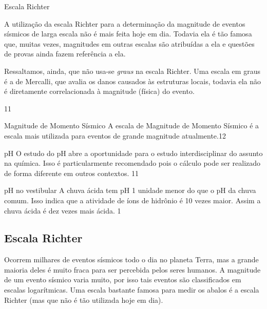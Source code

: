 \cleardoublepage
\def\currentcolor{session1}
\begin{sugestions}{Escala Richter}
{A utilização da escala Richter para a determinação da magnitude de  eventos sísmicos de larga escala não é mais feita hoje em dia. Todavia ela é tão famosa que, muitas vezes, magnitudes em outras escalas são atribuídas a ela e questões de provas ainda fazem referência a ela.

Ressaltamos, ainda, que não usa-se \textit{graus} na escala Richter. Uma escala em graus é a de Mercalli, que avalia os danos causados às estruturas locais, todavia ela não é diretamente correlacionada à magnitude (física) do evento.}{1}{1}
\end{sugestions}
\clearmargin
\begin{sugestions}{Magnitude de Momento Sísmico}
{A escala de Magnitude de Momento Sísmico é a escala mais utilizada para eventos de grande magnitude atualmente.}{1}{2}
\end{sugestions}
\clearmargin

\begin{sugestions}{pH}
{
	O estudo do pH abre a oportunidade para o estudo interdisciplinar do assunto na química. Isso é particularmente recomendado pois o cálculo pode ser realizado de forma diferente em outros contextos.
}{1}{1}
\end{sugestions}
\begin{answer}{pH no vestibular}
{
	A chuva ácida tem pH 1 unidade menor do que o pH da chuva comum. Isso indica que a atividade de íons de hidrônio é 10 vezes maior. Assim a chuva ácida é dez vezes mais ácida.
}{1}
\end{answer}


\subsection{Escala Richter}

Ocorrem milhares de eventos sísmicos todo o dia no planeta Terra, mas a grande maioria deles é muito fraca para ser percebida pelos seres humanos. A magnitude de um evento sísmico varia muito, por isso tais eventos são classificados em escalas logarítmicas. Uma escala bastante famosa para medir os abalos é a escala Richter (mas que não é tão utilizada hoje em dia).

